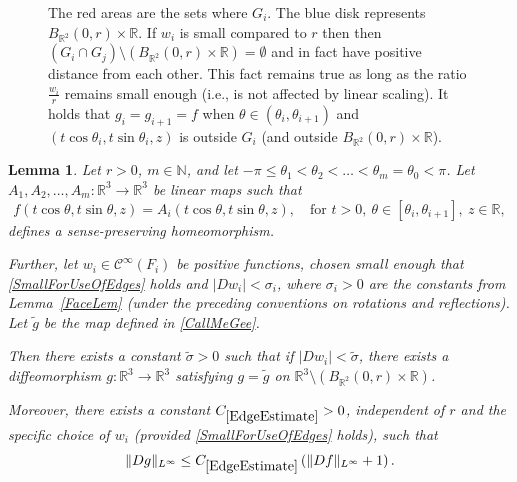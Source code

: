 \documentclass[12pt,a4paper]{amsart}
\theoremstyle{plain}
\newtheorem{lemma}[thm]{Lemma}
\theoremstyle{definition}
\numberwithin{equation}{section}
\def\er{\mathbb R}
\begin{document}
\begin{figure}[h]
		\caption{The red areas are the sets where $G_i$. The blue disk represents $B_{\er^2}(0,r)\times\er$. If $w_i$ is small compared to $r$ then then $(G_i\cap G_j) \setminus (B_{\er^2}(0,r)\times\er) = \emptyset$ and in fact have positive distance from each other. This fact remains true as  long as the ratio $\frac{w_i}{r}$ remains small enough (i.e., is not affected by linear scaling). It holds that $g_i = g_{i+1} = f$ when $\theta\in (\theta_i,\theta_{i+1})$ and $(t\cos\theta_i, t\sin\theta_i,z)$ is outside $G_i$ (and outside $B_{\er^2}(0,r)\times\er$).}
	\end{figure}\label{Fig:Edges}
	
	\begin{lemma}\label{SegLem}
		Let \( r > 0 \), \( m \in \mathbb{N} \), and let \( -\pi \leq \theta_1 < \theta_2 < \dots < \theta_m = \theta_0 < \pi \). Let \( A_1, A_2, \dots, A_m : \mathbb{R}^3 \to \mathbb{R}^3 \) be linear maps such that
		$$
		f(t\cos\theta, t\sin\theta, z) = A_i(t\cos\theta, t\sin\theta, z), \quad \text{for } t > 0,\ \theta \in [\theta_i, \theta_{i+1}],\ z \in \mathbb{R},
		$$
		defines a sense-preserving homeomorphism.
		
		Further, let \( w_i \in \mathcal{C}^{\infty}(F_i) \) be positive functions, chosen small enough that \eqref{SmallForUseOfEdges} holds and \( |D w_i| < \sigma_i \), where \( \sigma_i > 0 \) are the constants from Lemma~\ref{FaceLem} (under the preceding conventions on rotations and reflections). Let \( \tilde{g} \) be the map defined in \eqref{CallMeGee}.
		
		Then there exists a constant \( \tilde{\sigma} > 0 \) such that if \( |D w_i| < \tilde{\sigma} \), there exists a diffeomorphism \( g : \mathbb{R}^3 \to \mathbb{R}^3 \) satisfying \( g = \tilde{g} \) on \( \mathbb{R}^3 \setminus (B_{\mathbb{R}^2}(0, r) \times \mathbb{R}) \). 
		
		Moreover, there exists a constant \( C_{\ref{EdgeEstimate}} > 0 \), independent of \( r \) and the specific choice of \( w_i \) (provided \eqref{SmallForUseOfEdges} holds), such that
		\begin{equation}\label{EdgeEstimate}
			\|Dg\|_{L^\infty} \leq C_{\ref{EdgeEstimate}} \left( \|Df\|_{L^\infty} + 1 \right).
		\end{equation}
	\end{lemma}
	
\end{document}
